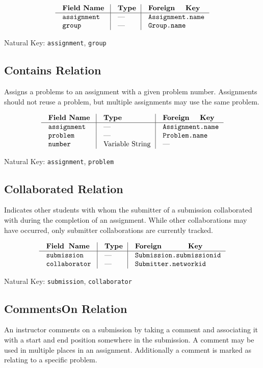 $$\vbox{
  \offinterlineskip
  \halign{
    \strut \quad {\tt #}  & \vrule\quad #  & \vrule\quad # \cr
    {\bf Field Name}  & {\bf Type}  & {\bf Foreign Key}\cr
    \noalign{\hrule}    
    assignment  & ---  & {\tt Assignment.name} \cr
    group  & ---  & {\tt Group.name} \cr
  }
}$$

{\noindent
Natural Key: {\tt assignment}, {\tt group}\par}

\subsection{Contains Relation}
Assigns a problems to an assignment with a given problem number.
Assignments should not reuse a problem,
but multiple assignments may use the same problem.

$$\vbox{
  \offinterlineskip
  \halign{
    \strut \quad {\tt #}  & \vrule\quad #  & \vrule\quad # \cr
    {\bf Field Name}  & {\bf Type}  & {\bf Foreign Key}\cr
    \noalign{\hrule}    
    assignment  & ---  & {\tt Assignment.name} \cr
    problem  & ---  & {\tt Problem.name} \cr
    number  & Variable String  & --- \cr
  }
}$$

{\noindent
Natural Key: {\tt assignment}, {\tt problem}\par}

\subsection{Collaborated Relation}
Indicates other students with whom the submitter of a submission
collaborated with during the completion of an assignment.
While other collaborations may have occurred, only submitter 
collaborations are currently tracked.

$$\vbox{
  \offinterlineskip
  \halign{
    \strut \quad {\tt #}  & \vrule\quad #  & \vrule\quad # \cr
    {\bf Field Name}  & {\bf Type}  & {\bf Foreign Key}\cr
    \noalign{\hrule}   
    submission & --- & {\tt Submission.submissionid} \cr 
    collaborator  & ---  & {\tt Submitter.networkid} \cr
  }
}$$

{\noindent
Natural Key: {\tt submission}, {\tt collaborator}\par}

\subsection{CommentsOn Relation}
An instructor comments on a submission by taking a comment 
and associating it with a start and end position somewhere in the submission. 
A comment may be used in multiple places in an assignment. 
Additionally a comment is marked as relating to a specific problem.

